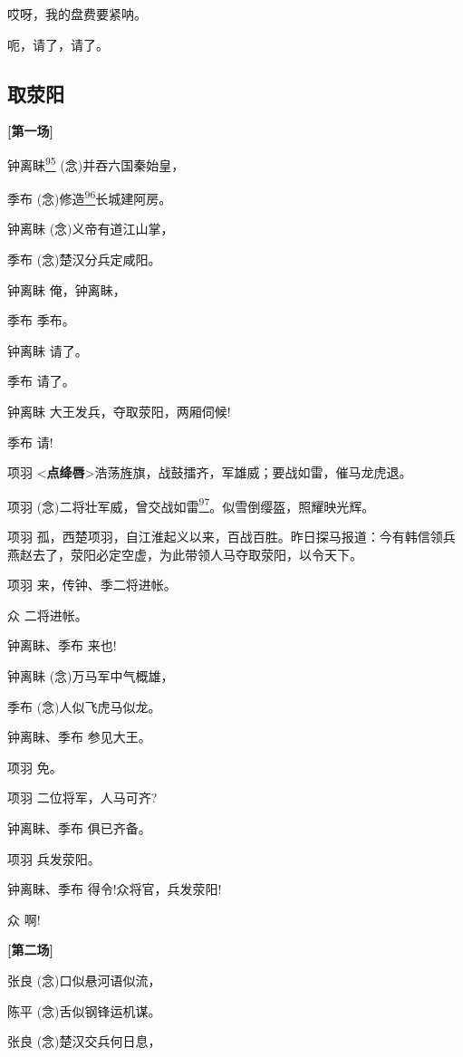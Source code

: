 哎呀，我的盘费要紧呐。

呃，请了，请了。

\newpage
\hypertarget{ux53d6ux8365ux9633}{%
\subsection{取荥阳}\label{ux53d6ux8365ux9633}}

\textbf{{[}第一场{]}}

钟离眛\protect\hyperlink{fn95}{\textsuperscript{95}}
(念)并吞六国秦始皇，

季布 (念)修造\protect\hyperlink{fn96}{\textsuperscript{96}}长城建阿房。

钟离眛 (念)义帝有道江山掌，

季布 (念)楚汉分兵定咸阳。

钟离眛 俺，钟离眛，

季布 季布。

钟离眛 请了。

季布 请了。

钟离眛 大王发兵，夺取荥阳，两厢伺候!

季布 请!

项羽
\textless{}\textbf{点绛唇}\textgreater{}浩荡旌旗，战鼓擂齐，军雄威；要战如雷，催马龙虎退。

项羽
(念)二将壮军威，曾交战如雷\protect\hyperlink{fn97}{\textsuperscript{97}}。似雪倒缨盔，照耀映光辉。

项羽
孤，西楚项羽，自江淮起义以来，百战百胜。昨日探马报道：今有韩信领兵燕赵去了，荥阳必定空虚，为此带领人马夺取荥阳，以令天下。

项羽 来，传钟、季二将进帐。

众 二将进帐。

钟离眛、季布 来也!

钟离眛 (念)万马军中气概雄，

季布 (念)人似飞虎马似龙。

钟离眛、季布 参见大王。

项羽 免。

项羽 二位将军，人马可齐?

钟离眛、季布 俱已齐备。

项羽 兵发荥阳。

钟离眛、季布 得令!众将官，兵发荥阳!

众 啊!

\textbf{{[}第二场{]}}

张良 (念)口似悬河语似流，

陈平 (念)舌似钢锋运机谋。

张良 (念)楚汉交兵何日息，

